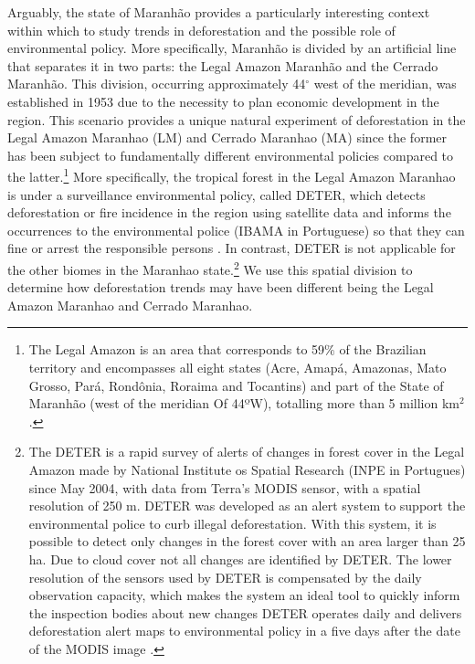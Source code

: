 Arguably, the state of Maranhão provides a particularly interesting context within which to study trends in deforestation and the possible role of environmental policy.  More specifically, Maranhão is divided by an artificial line that separates it in two parts: the Legal Amazon Maranhão and the Cerrado Maranhão. This division, occurring approximately 44$^{\circ}$ west of the meridian, was established in 1953 due to the necessity to plan economic development in the region. This scenario provides a unique natural experiment of deforestation in the Legal Amazon Maranhao (LM) and Cerrado Maranhao (MA) since the former has been subject to fundamentally different environmental policies compared to the latter.\footnote{The Legal Amazon is an area that corresponds to 59$\%$ of the Brazilian territory and encompasses all eight states (Acre, Amapá, Amazonas, Mato Grosso, Pará, Rondônia, Roraima and Tocantins) and part of the State of Maranhão (west of the meridian Of 44ºW), totalling more than 5 million km$^{2}$ \citep{IPEA2}.} More specifically, the tropical forest in the Legal Amazon Maranhao is under a surveillance environmental policy, called DETER, which detects deforestation or fire incidence  in the region using satellite data and informs the occurrences to the environmental police (IBAMA in Portuguese) so that they can fine or arrest the responsible persons \citep{IBAMAwebsite}. In contrast, DETER is not applicable for the other biomes in the Maranhao state.\footnote{The DETER is a rapid survey of alerts of changes in forest cover in the Legal Amazon made by National Institute os Spatial Research (INPE in Portugues) since May 2004, with data from Terra's MODIS sensor, with a spatial resolution of 250 m. DETER was developed as an alert system to support the environmental police to curb illegal deforestation. With this system, it is possible to detect only changes in the forest cover with an area larger than 25 ha. Due to cloud cover not all changes are identified by DETER. The lower resolution of the sensors used by DETER is compensated by the daily observation capacity, which makes the system an ideal tool to quickly inform the inspection bodies about new changes DETER operates daily and delivers deforestation alert maps to environmental policy in a five days after the date of the MODIS image \citep{inpe-deter_2018}.} We use this spatial division to determine how deforestation trends may have been different being the Legal Amazon Maranhao and Cerrado Maranhao.

